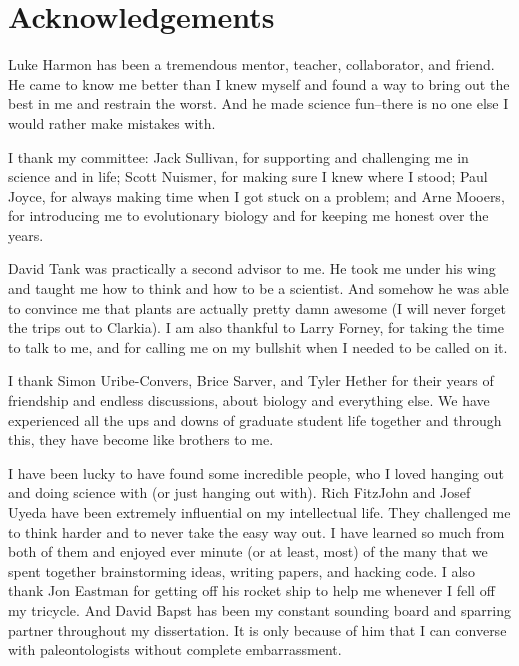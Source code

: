 \chapter*{Acknowledgements}

Luke Harmon has been a tremendous mentor, teacher, collaborator, and friend. He came to know me better than I knew myself and found a way to bring out the best in me and restrain the worst. And he made science fun--there is no one else I would rather make mistakes with. 

I thank my committee: Jack Sullivan, for supporting and challenging me in science and in life; Scott Nuismer, for making sure I knew where I stood; Paul Joyce, for always making time when I got stuck on a problem; and Arne Mooers, for introducing me to evolutionary biology and for keeping me honest over the years.

David Tank was practically a second advisor to me. He took me under his wing and taught me how to think and how to be a scientist. And somehow he was able to convince me that plants are actually pretty damn awesome (I will never forget the trips out to Clarkia). I am also thankful to Larry Forney, for taking the time to talk to me, and for calling me on my bullshit when I needed to be called on it.

I thank Simon Uribe-Convers, Brice Sarver, and Tyler Hether for their years of friendship and endless discussions, about biology and everything else. We have experienced all the ups and downs of graduate student life together and through this, they have become like brothers to me.

I have been lucky to have found some incredible people, who I loved hanging out and doing science with (or just hanging out with). Rich FitzJohn and Josef Uyeda have been extremely influential on my intellectual life. They challenged me to think harder and to never take the easy way out. I have learned so much from both of them and enjoyed ever minute (or at least, most) of the many that we spent together brainstorming ideas, writing papers, and hacking code. I also thank Jon Eastman for getting off his rocket ship to help me whenever I fell off my tricycle. And David Bapst has been my constant sounding board and sparring partner throughout my dissertation. It is only because of him that I can converse with paleontologists without complete embarrassment.

